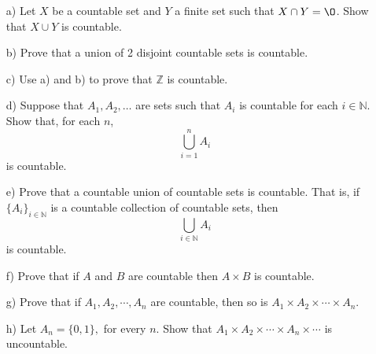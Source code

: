 \documentclass[11pt]{article}
\newcommand{\bbN}{\mathbb{N}}
\newcommand{\bbZ}{\mathbb{Z}}
\renewcommand{\emptyset}{\O}
\theoremstyle{definition}
\numberwithin{equation}{subsection}
\begin{document}
\begin{enumerate}
\begin{enumerate}
\item[a)]  
Let $X$ be a countable set and $Y$ a finite set such that $X\cap Y=\emptyset$. Show that $X\cup Y$ is countable. 
 \item[b)] Prove that a union of 2 disjoint countable sets is countable.
  \item[c)] Use a) and b) to prove that $\bbZ$ is countable.
 \item[d)] Suppose that $A_1, A_2, \dots$ are sets such that $A_i$ is countable for each $i \in\bbN$. Show that, for each $n$, \[\bigcup_{i=1}^n A_i\] is countable.
     \item[e)] Prove that a countable union of countable sets is countable. That is, if $\{A_i\}_{i\in\bbN} $ is a countable  collection of countable sets, then 
  $$\bigcup_{i\in\bbN} A_i$$ 
  is countable.
  \item[f)]  Prove that if $A$ and $B$ are countable then $A\times B$ is countable.
  \item[g)] Prove that if $A_1,A_2,\cdots, A_n$ are countable, then so is $A_1\times A_2\times \cdots\times A_n.$
  \item[h)] Let $A_n=\{0,1\},$ for every $n.$ Show that $A_1\times A_2\times\cdots\times A_n\times\cdots$ is uncountable.

 \end{enumerate}





\end{enumerate}
\end{document}
